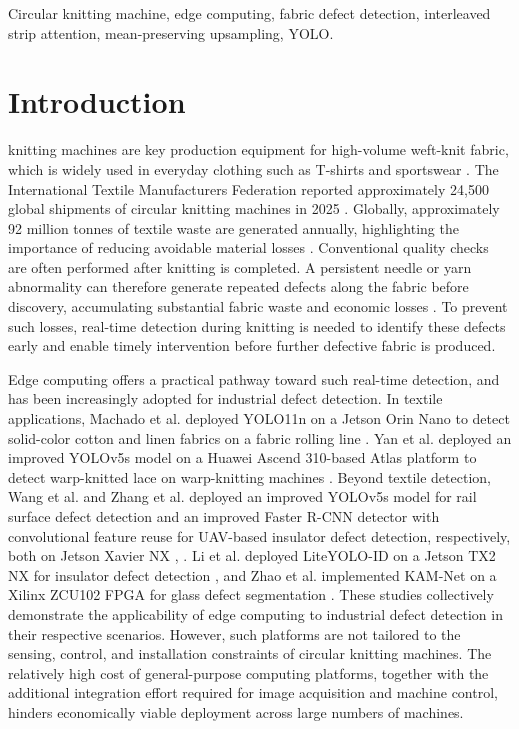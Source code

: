 \documentclass[lettersize,journal]{IEEEtran}
\begin{document}
\begin{IEEEkeywords}
Circular knitting machine, edge computing, fabric defect detection, interleaved strip attention, mean-preserving upsampling, YOLO.
\end{IEEEkeywords}


\section{Introduction}
 knitting machines are key production equipment for high-volume weft-knit fabric, which is widely used in everyday clothing such as T-shirts and sportswear \cite{cottonworksKnitBasics,woolmarkCircularKnitting,cottonworksSingleDouble}. The International Textile Manufacturers Federation reported approximately 24,500 global shipments of circular knitting machines in 2025 \cite{itmf2025press}. Globally, approximately 92 million tonnes of textile waste are generated annually, highlighting the importance of reducing avoidable material losses \cite{unep2025textilewaste}. Conventional quality checks are often performed after knitting is completed. A persistent needle or yarn abnormality can therefore generate repeated defects along the fabric before discovery, accumulating substantial fabric waste and economic losses \cite{takeuchi2018knitted,akter2022material,xiang2023hooknet}. To prevent such losses, real-time detection during knitting is needed to identify these defects early and enable timely intervention before further defective fabric is produced.

Edge computing offers a practical pathway toward such real-time detection, and has been increasingly adopted for industrial defect detection. In textile applications, Machado et al. deployed YOLO11n on a Jetson Orin Nano to detect solid-color cotton and linen fabrics on a fabric rolling line \cite{machado2025edgefabric}. Yan et al. deployed an improved YOLOv5s model on a Huawei Ascend 310-based Atlas platform to detect warp-knitted lace on warp-knitting machines \cite{yan2026warplace}. Beyond textile detection, Wang et al. and Zhang et al. deployed an improved YOLOv5s model for rail surface defect detection and an improved Faster R-CNN detector with convolutional feature reuse for UAV-based insulator defect detection, respectively, both on Jetson Xavier NX \cite{wang2024rail}, \cite{zhang2026uavedge}. Li et al. deployed LiteYOLO-ID on a Jetson TX2 NX for insulator defect detection \cite{li2024liteyolo}, and Zhao et al. implemented KAM-Net on a Xilinx ZCU102 FPGA for glass defect segmentation \cite{zhao2025kamnet}. These studies collectively demonstrate the applicability of edge computing to industrial defect detection in their respective scenarios. However, such platforms are not tailored to the sensing, control, and installation constraints of circular knitting machines. The relatively high cost of general-purpose computing platforms, together with the additional integration effort required for image acquisition and machine control, hinders economically viable deployment across large numbers of machines.
\end{document}
